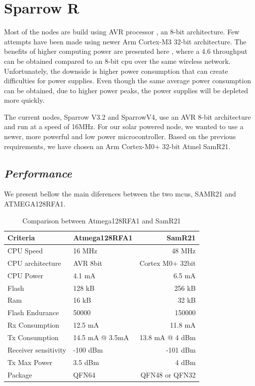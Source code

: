 \normalfont\normalsize
\chapter{Sparrow R}

Most of the nodes are build using AVR processor \cite{nodelist}, an 8-bit architecture. Few attempts have been made
using newer Arm Cortex-M3 32-bit architecture. The benefits of higher computing power are presented here
\cite{jurdak2011opal}, where a 4.6 throughput can be obtained compared to an 8-bit cpu over the
same wireless network. Unfortunately, the downside is higher power consumption that can create
difficulties for power supplies. Even though the same average power consumption can be obtained, due
to higher power peaks, the power supplies will be depleted more quickly.

The current nodes, Sparrow V3.2 and SparrowV4, use an AVR 8-bit architecture and run at a speed of
16MHz. For our solar powered node, we wanted to use a newer, more powerful and low power
microcontroller. Based on the previous requirements, we have chosen an Arm Cortex-M0+ 32-bit Atmel SamR21.


\section{\textit{Performance}}

We present bellow the main diferences between the two mcus, SAMR21 and ATMEGA128RFA1.

\begin{table} \centering
\begin{tabular}{llr}
\hline
Criteria    & Atmega128RFA1 & SamR21 \\
\hline
CPU Speed      & 16 MHz    & 48 MHz      \\
CPU architecture      & AVR 8bit    & Cortex M0+ 32bit      \\
CPU Power          & 4.1 mA       & 6.5 mA       \\
Flash           & 128 kB        & 256 kB        \\
Ram                 & 16 kB     & 32 kB         \\
Flash Endurance     &  50000    & 150000        \\
Rx Consumption       & 12.5 mA     & 11.8 mA     \\
Tx Consumption       & 14.5 mA @ 3.5mA     & 13.8 mA @ 4 dBm      \\
Receiver sensitivity & -100 dBm      & -101 dBm       \\
Tx Max Power & 3.5 dBm      & 4 dBm       \\
Package & QFN64      & QFN48 or QFN32      \\
\hline
\end{tabular}
\caption{Comparison between Atmega128RFA1 and SamR21}
\end{table}

